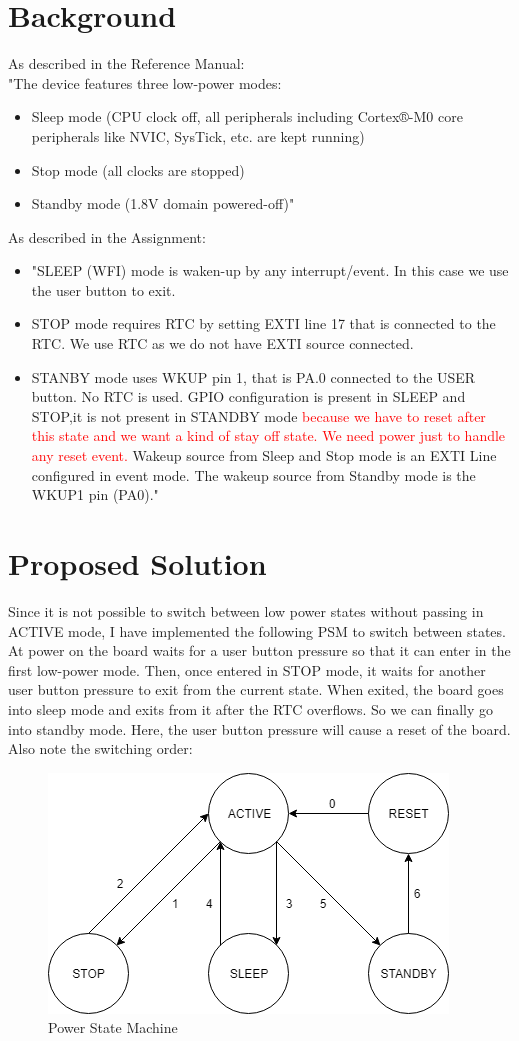 \documentclass[peerreview]{IEEEtran}
\begin{document}
\section{Background}
As described in the Reference Manual:\\
"The device features three low-power modes:
\begin{itemize}
\item Sleep mode (CPU clock off, all peripherals including Cortex®-M0 core peripherals like
NVIC, SysTick, etc. are kept running)
\item Stop mode (all clocks are stopped)
\item Standby mode (1.8V domain powered-off)"
\end{itemize}
As described in the Assignment:
\begin{itemize}
\item "SLEEP (WFI) mode is waken-up by any interrupt/event. In this case we use the user button to exit.
\item STOP mode requires RTC by setting EXTI line 17 that is connected to the RTC. We use RTC as we do not have EXTI source connected.
\item STANBY mode uses WKUP pin 1, that is PA.0 connected to the USER button. No RTC is used.
GPIO configuration is present in SLEEP and STOP,it is not present in STANDBY mode \textcolor{red}{because we have to reset after this state and we want a kind of stay off state. We need power just to handle any reset event.} Wakeup source from Sleep and Stop mode is an EXTI Line configured in event mode. The wakeup source from
Standby mode is the WKUP1 pin (PA0)."
\end{itemize}
\section{Proposed Solution}
Since it is not possible to switch between low power states without passing in ACTIVE mode, I have implemented the following PSM to switch between states. At power on the board waits for a user button pressure so that it can enter in the first low-power mode. Then, once entered in STOP mode, it waits for another user button pressure to exit from the current state. When exited, the board goes into sleep mode and exits from it after the RTC overflows. So we can finally go into standby mode. Here, the user button pressure will cause a reset of the board. Also note the switching order:
\begin{figure}[!ht]
\centering
\includegraphics[width=0.8\columnwidth]{psm} 
\caption{Power State Machine}
\label{fig_sim}
\end{figure} 
\end{document}

